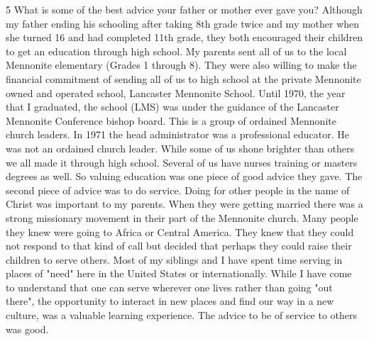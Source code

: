 5 What is some of the best advice your father or mother ever gave you?
Although my father ending his schooling after taking 8th grade twice and my mother when she turned 16 and had completed 11th grade, they both encouraged their children to get an education through high school. My parents sent all of us to the local Mennonite elementary (Grades 1 through 8). They were also willing to make the financial commitment of sending all of us to high school at the private Mennonite owned and operated school, Lancaster Mennonite School. Until 1970, the year that I graduated, the school (LMS) was under the guidance of the Lancaster Mennonite Conference bishop board. This is a group of ordained Mennonite church leaders. In 1971 the head administrator was a professional educator. He was not an ordained church leader. While some of us shone brighter than others we all made it through high school. Several of us have nurses training or masters degrees as well. So valuing education was one piece of good advice they gave.
The second piece of advice was to do service. Doing for other people in the name of Christ was important to my parents. When they were getting married there was a strong missionary movement in their part of the Mennonite church. Many people they knew were going to Africa or Central America. They knew that they could not respond to that kind of call but decided that perhaps they could raise their children to serve others. Most of my siblings and I have spent time serving in places of "need" here in the United States or internationally. While I have come to understand that one can serve wherever one lives rather than going "out there", the opportunity to interact in new places and find our way in a new culture, was a valuable learning experience. The advice to be of service to others was good.





